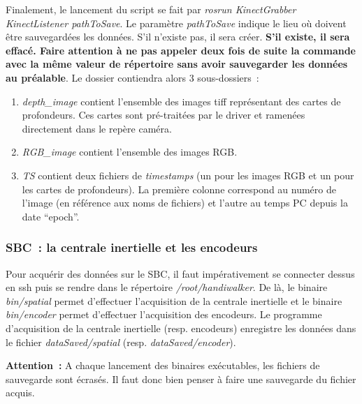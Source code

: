 \documentclass[a4paper, 10pt ]{article}
\begin{document}
Finalement, le lancement du script se fait par \emph{rosrun KinectGrabber KinectListener pathToSave}. Le paramètre \emph{pathToSave} indique le lieu où doivent être sauvegardées les données. S'il n'existe pas, il sera créer. \textbf{S'il existe, il sera effacé. Faire attention à ne pas appeler deux fois de suite la commande avec la même valeur de répertoire sans avoir sauvegarder les données au préalable}. Le dossier contiendra alors 3 sous-dossiers~:
\begin{enumerate}
	\item \emph{depth\_image} contient l'ensemble des images tiff représentant des cartes de profondeurs. Ces cartes sont pré-traitées par le driver et ramenées directement dans le repère caméra.  
	\item \emph{RGB\_image} contient l'ensemble des images RGB.
	\item \emph{TS} contient deux fichiers de \emph{timestamps} (un pour les images RGB et un pour les cartes de profondeurs). La première colonne correspond au numéro de l'image (en référence aux noms de fichiers) et l'autre au temps PC depuis la date ``epoch''.
\end{enumerate}
\subsubsection{SBC~: la centrale inertielle et les encodeurs}
Pour acquérir des données sur le SBC, il faut impérativement se connecter dessus en ssh puis se rendre dans le répertoire \emph{/root/handiwalker}. De là, le binaire \emph{bin/spatial} permet d'effectuer l'acquisition de la centrale inertielle et le binaire \emph{bin/encoder} permet d'effectuer l'acquisition des encodeurs. Le programme d'acquisition de la centrale inertielle (resp. encodeurs) enregistre les données dans le fichier \emph{dataSaved/spatial} (resp. \emph{dataSaved/encoder}).

\textbf{Attention~:} A chaque lancement des binaires exécutables, les fichiers de sauvegarde sont écrasés. Il faut donc bien penser à faire une sauvegarde du fichier acquis.
\end{document}
